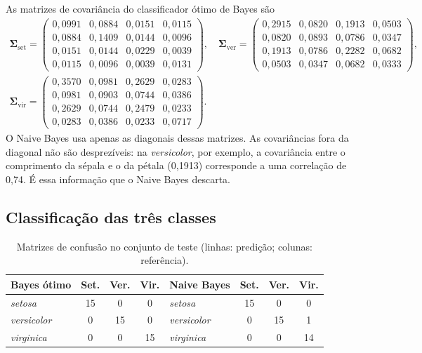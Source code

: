 \documentclass[12pt,a4paper]{article}
\newcommand{\setosa}{\emph{setosa}}
\newcommand{\versicolor}{\emph{versicolor}}
\newcommand{\virginica}{\emph{virginica}}
\begin{document}
As matrizes de covariância do classificador ótimo de Bayes são
\begin{gather*}
\boldsymbol{\Sigma}_{\text{set}} = \begin{pmatrix}0{,}0991 & 0{,}0884 & 0{,}0151 & 0{,}0115 \\ 0{,}0884 & 0{,}1409 & 0{,}0144 & 0{,}0096 \\ 0{,}0151 & 0{,}0144 & 0{,}0229 & 0{,}0039 \\ 0{,}0115 & 0{,}0096 & 0{,}0039 & 0{,}0131\end{pmatrix}, \quad
\boldsymbol{\Sigma}_{\text{ver}} = \begin{pmatrix}0{,}2915 & 0{,}0820 & 0{,}1913 & 0{,}0503 \\ 0{,}0820 & 0{,}0893 & 0{,}0786 & 0{,}0347 \\ 0{,}1913 & 0{,}0786 & 0{,}2282 & 0{,}0682 \\ 0{,}0503 & 0{,}0347 & 0{,}0682 & 0{,}0333\end{pmatrix}, \\[0.5em]
\boldsymbol{\Sigma}_{\text{vir}} = \begin{pmatrix}0{,}3570 & 0{,}0981 & 0{,}2629 & 0{,}0283 \\ 0{,}0981 & 0{,}0903 & 0{,}0744 & 0{,}0386 \\ 0{,}2629 & 0{,}0744 & 0{,}2479 & 0{,}0233 \\ 0{,}0283 & 0{,}0386 & 0{,}0233 & 0{,}0717\end{pmatrix}.
\end{gather*}
O Naive Bayes usa apenas as diagonais dessas matrizes. As covariâncias fora da diagonal não são desprezíveis: na \versicolor{}, por exemplo, a covariância entre o comprimento da sépala e o da pétala (0,1913) corresponde a uma correlação de 0,74. É essa informação que o Naive Bayes descarta.

\subsection{Classificação das três classes}

\begin{table}[H]
\centering
\caption{Matrizes de confusão no conjunto de teste (linhas: predição; colunas: referência).}
\label{tab:mc3}
\begin{tabular}{l|ccc||l|ccc}
\toprule
Bayes ótimo & Set. & Ver. & Vir. & Naive Bayes & Set. & Ver. & Vir. \\
\midrule
\setosa{}     & 15 & 0  & 0  & \setosa{}     & 15 & 0  & 0  \\
\versicolor{} & 0  & 15 & 0  & \versicolor{} & 0  & 15 & 1  \\
\virginica{}  & 0  & 0  & 15 & \virginica{}  & 0  & 0  & 14 \\
\bottomrule
\end{tabular}
\end{table}
\end{document}
